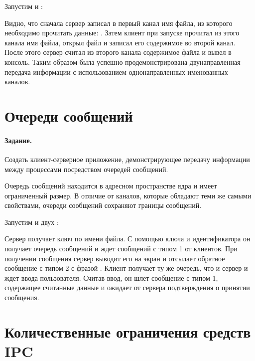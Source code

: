 

Запустим  и :



Видно, что сначала сервер записал в первый канал имя файла, из которого необходимо прочитать данные: . Затем клиент при запуске прочитал из этого канала имя файла, открыл файл и записал его содержимое во второй канал. После этого сервер считал из второго канала содержимое файла и вывел в консоль. Таким образом была успешно продемонстрирована двунаправленная передача информации с использованием однонаправленных именованных каналов. 

\section{Очереди сообщений}

\paragraph{Задание.} Создать клиент-серверное приложение, демонстрирующее передачу информации между процессами посредством очередей сообщений.

Очередь сообщений находится в адресном пространстве ядра и имеет
ограниченный размер. В отличие от каналов, которые обладают теми же
самыми свойствами, очереди сообщений сохраняют границы сообщений.



Запустим  и двух :




Сервер получает ключ по имени файла. С помощью ключа и идентификатора он получает очередь сообщений и ждет сообщений с типом 1 от клиентов. При получении сообщения сервер выводит его на экран и отсылает обратное сообщение с типом 2 с фразой . Клиент получает ту же очередь, что и сервер и ждет ввода пользователя. Считав ввод, он шлет сообщение с типом 1, содержащее считанные данные и ожидает от сервера подтверждения о принятии сообщения.

\section{Количественные ограничения средств IPC}

